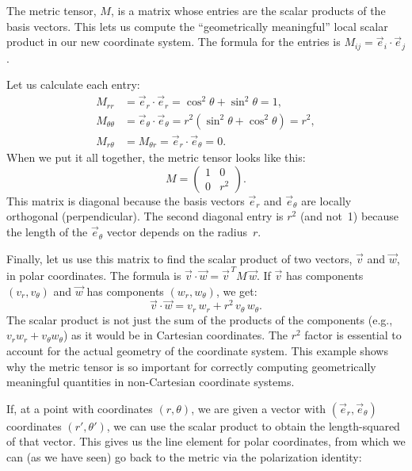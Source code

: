 \documentclass[twocolumn]{article}
\begin{document}
The metric tensor, $M$, is a matrix whose entries are the scalar
products of the basis vectors.  This lets us compute the ``geometrically
meaningful'' local scalar product in our new coordinate system.  The
formula for the entries is $M_{ij} = \vec{e}_i \cdot \vec{e}_j$.

Let us calculate each entry:
\begin{align*}
  M_{rr} &= \vec{e}_r \cdot \vec{e}_r
           = \cos^2\theta + \sin^2\theta = 1, \\
  M_{\theta\theta} &= \vec{e}_\theta \cdot \vec{e}_\theta
           = r^2(\sin^2\theta + \cos^2\theta) = r^2, \\
  M_{r\theta} &= M_{\theta r}
           = \vec{e}_r \cdot \vec{e}_\theta = 0.
\end{align*}
When we put it all together, the metric tensor looks like this:
\begin{equation}
  M = \begin{pmatrix} 1 & 0 \\ 0 & r^2 \end{pmatrix}.
\end{equation}
This matrix is diagonal because the basis vectors $\vec{e}_r$ and
$\vec{e}_\theta$ are locally orthogonal (perpendicular).  The second
diagonal entry is $r^2$ (and not~1) because the length of the
$\vec{e}_\theta$ vector depends on the radius~$r$.

Finally, let us use this matrix to find the scalar product of two
vectors, $\vec{v}$ and $\vec{w}$, in polar coordinates.  The formula is
$\vec{v}\cdot\vec{w} = \vec{v}^{\,T} M\, \vec{w}$.  If $\vec{v}$ has
components $(v_r, v_\theta)$ and $\vec{w}$ has components
$(w_r, w_\theta)$, we get:
\begin{equation}
  \vec{v} \cdot \vec{w}
    = v_r\, w_r + r^2\, v_\theta\, w_\theta.
\end{equation}
The scalar product is not just the sum of the products of the components
(e.g., $v_r w_r + v_\theta w_\theta$) as it would be in Cartesian
coordinates.  The $r^2$ factor is essential to account for the actual
geometry of the coordinate system.  This example shows why the metric
tensor is so important for correctly computing geometrically meaningful
quantities in non-Cartesian coordinate systems.

If, at a point with coordinates $(r, \theta)$, we are given a vector
with $(\vec e_r, \vec e_\theta)$ coordinates $(r', \theta')$, we can
use the scalar product to obtain the length-squared of that
vector. This gives us the line element for polar coordinates, from
which we can (as we have seen) go back to the metric via the
polarization identity:
\end{document}
